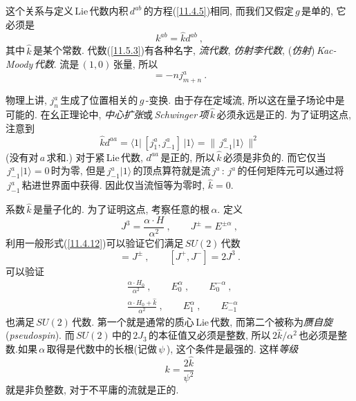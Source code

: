 \noindent 这个关系与定义\,Lie\,代数内积$\,d^{ab}\,$的方程(\ref{11.4.5})相同, 而我们又假定$\,g\,$是单的, 它必须是
\begin{equation}
    k^{ab}=\hat{k}d^{ab} \:, \label{11.5.7}
\end{equation}
其中$\,\hat{k}\,$是某个常数. 代数(\ref{11.5.3})有各种名字, {\emph{流代数}}, {\emph{仿射李代数}}, ({\emph{仿射}})\,\emph{Kac-Moody}\,{\emph{代数}}. 流是$\,(1,0)\,$张量, 所以
\begin{equation}
    [L_{m},j_{n}^{a}] = -nj_{m+n}^{a} \:. \label{11.5.8}
\end{equation}

物理上讲, $j_{n}^{a}\,$生成了位置相关的$\,g\,$-变换. 由于存在定域流, 所以这在量子场论中是可能的. 在幺正理论中, {\emph{中心扩张}}或\emph{\,Schwinger\,}{\emph{项}}$\,\hat{k}\,$必须永远是正的. 为了证明这点, 注意到
\begin{equation}
\hat{k}d^{aa}= \langle 1\rvert\,[j_{1}^{a},j_{-1}^{a}]\,\lvert 1 \rangle = \lVert\,j_{-1}^{a}\lvert1\rangle\,\rVert^{2}  \label{11.5.9}
\end{equation}
(没有对$\,a\,$求和.) 对于紧\,Lie\,代数, $d^{aa}\,$是正的, 所以$\,\hat{k}\,$必须是非负的. 而它仅当$\,j_{-1}^{a}\lvert1\rangle=0\,$时为零, 但是$\,j_{-1}^{a}\lvert1\rangle\,$的顶点算符就是流$\,j^{a}\,$: $j^{a}\,$的任何矩阵元可以通过将$\,j_{-1}^{a}\,$粘进世界面中获得. 因此仅当流恒等为零时, $\hat{k}=0$.

系数$\,\hat{k}\,$是量子化的. 为了证明这点, 考察任意的根$\,\alpha$. 定义
\begin{equation}
    J^{3} =\frac{\alpha\cdot H}{\alpha^{2}}\:, \qquad J^{\pm}=E^{\pm\alpha} \:, \label{11.5.10}
\end{equation}
利用一般形式(\ref{11.4.12})可以验证它们满足$\,SU(2)\,$代数
\begin{equation}
    [J^{3},J^{\pm}]=J^{\pm}\:, \qquad [J^{+},J^{-}]=2J^{3} \:. \label{11.5.11}
\end{equation}
可以验证
\begin{subequations}
\begin{align}
    &\frac{\alpha\cdot H_{0}}{\alpha^{2}}\:, \qquad E_{0}^{\alpha}\:,\qquad E_{0}^{-\alpha} \:, \label{11.5.12a}\\
    &\frac{\alpha\cdot H_{0}+\hat{k}}{\alpha^{2}}\:, \qquad E_{1}^{\alpha}\:, \qquad E_{-1}^{-\alpha} \:\label{11.5.12b}
\end{align} \label{15.5.12}
\end{subequations}
也满足$\,SU(2)\,$代数. 第一个就是通常的质心\,Lie\,代数, 而第二个被称为{\emph{赝自旋}}(\emph{pseudospin}). 而$\,SU(2)\,$中的$\,2J_{3}\,$的本征值又必须是整数, 所以$\,2\hat{k}/\alpha^{2}\,$也必须是整数.如果$\,\alpha\,$取得是代数中的长根(记做$\,\psi\,$), 这个条件是最强的. 这样{\emph{等级}}
\begin{equation}
    k=\frac{2\hat{k}}{\psi^{2}} \label{11.5.13}
\end{equation}
就是非负整数, 对于不平庸的流就是正的.

